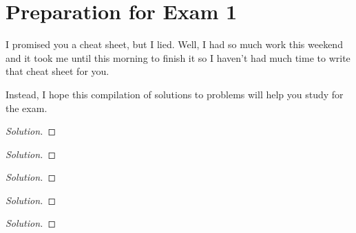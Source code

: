 \chapter{Preparation for Exam 1}
I promised you a cheat sheet, but I lied. Well, I had so much work this
weekend and it took me until this morning to finish it so I haven't had
much time to write that cheat sheet for you.

Instead, I hope this compilation of solutions to problems will help you
study for the exam.

\begin{problem}

\end{problem}
\begin{proof}[Solution]
\end{proof}

\begin{problem}
\end{problem}
\begin{proof}[Solution]
\end{proof}

\begin{problem}
\end{problem}
\begin{proof}[Solution]
\end{proof}

\begin{problem}
\end{problem}
\begin{proof}[Solution]
\end{proof}

\begin{problem}
\end{problem}
\begin{proof}[Solution]
\end{proof}

